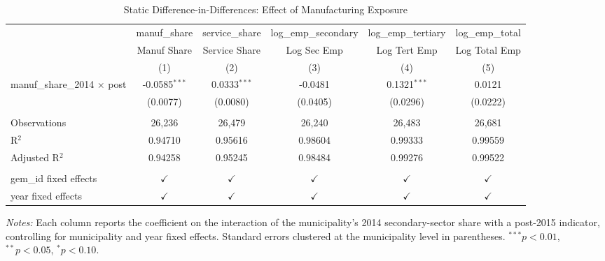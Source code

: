 
\begin{table}[htbp]
   \caption{\label{tab:static_did} Static Difference-in-Differences: Effect of Manufacturing Exposure}
   \bigskip
   \centering
   \begin{adjustbox}{max width=\textwidth}
   \begin{tabular}{lccccc}
      \toprule
                                          & manuf\_share    & service\_share  & log\_emp\_secondary   & log\_emp\_tertiary   & log\_emp\_total\\    
                                          & Manuf Share     & Service Share   & Log Sec Emp           & Log Tert Emp         & Log Total Emp \\   
                                          & (1)             & (2)             & (3)                   & (4)                  & (5)\\  
      \midrule 
      manuf\_share\_2014 $\times$ post    & -0.0585$^{***}$ & 0.0333$^{***}$  & -0.0481               & 0.1321$^{***}$       & 0.0121\\   
                                          & (0.0077)        & (0.0080)        & (0.0405)              & (0.0296)             & (0.0222)\\   
       \\
      Observations                        & 26,236          & 26,479          & 26,240                & 26,483               & 26,681\\  
      R$^2$                               & 0.94710         & 0.95616         & 0.98604               & 0.99333              & 0.99559\\  
      Adjusted R$^2$                      & 0.94258         & 0.95245         & 0.98484               & 0.99276              & 0.99522\\  
       \\
      gem\_id fixed effects               & $\checkmark$    & $\checkmark$    & $\checkmark$          & $\checkmark$         & $\checkmark$\\   
      year fixed effects                  & $\checkmark$    & $\checkmark$    & $\checkmark$          & $\checkmark$         & $\checkmark$\\   
      \bottomrule
   \end{tabular}
   \end{adjustbox}

   \par \raggedright \footnotesize
   \textit{Notes:} Each column reports the coefficient on the interaction of the municipality's 2014 secondary-sector share with a post-2015 indicator, controlling for municipality and year fixed effects. Standard errors clustered at the municipality level in parentheses. $^{***}p<0.01$, $^{**}p<0.05$, $^{*}p<0.10$.
\end{table}


